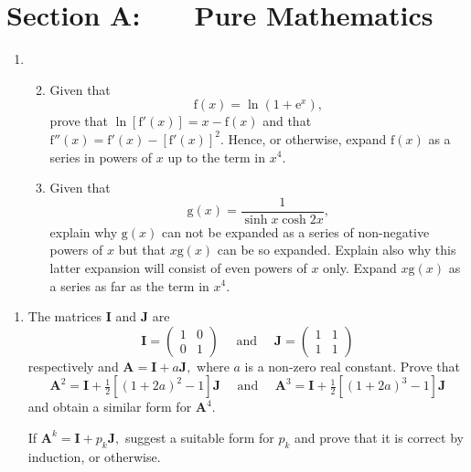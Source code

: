 \documentclass[a4, 11pt]{report}
\newlength{\qspace}
\newcounter{qnumber}
\newenvironment{question}%
 {\vspace{\qspace}
  \begin{enumerate}[\bfseries 1\quad][10]%
    \setcounter{enumi}{\value{qnumber}}%
    \item%
 }
{
  \end{enumerate}
  \filbreak
  \stepcounter{qnumber}
 }
\newenvironment{questionparts}[1][1]%
 {
  \begin{enumerate}[\bfseries (i)]%
    \setcounter{enumii}{#1}
    \addtocounter{enumii}{-1}
    \setlength{\itemsep}{5mm}
    \setlength{\parskip}{8pt}
 }
 {
  \end{enumerate}
 }
\begin{document}
\setcounter{page}{2}

 
\section*{Section A: \ \ \ Pure Mathematics}

\begin{question}
\begin{questionparts}


\item Given that 
\[
\mathrm{f}(x)=\ln(1+\mathrm{e}^{x}),
\]
prove that $\ln[\mathrm{f}'(x)]=x-\mathrm{f}(x)$ and that $\mathrm{f}''(x)=\mathrm{f}'(x)-[\mathrm{f}'(x)]^{2}.$
Hence, or otherwise, expand $\mathrm{f}(x)$ as a series in powers
of $x$ up to the term in $x^{4}.$ 


\item Given that 
\[
\mathrm{g}(x)=\frac{1}{\sinh x\cosh2x},
\]
explain why $\mathrm{g}(x)$ can not be expanded as a series of non-negative
powers of $x$ but that $x\mathrm{g}(x)$ can be so expanded. Explain
also why this latter expansion will consist of even powers of $x$
only. Expand $x\mathrm{g}(x)$ as a series as far as the term in $x^{4}.$
\end{questionparts}

\end{question}

\begin{question}
The matrices $\mathbf{I}$ and $\mathbf{J}$ are 
\[
\mathbf{I}=\begin{pmatrix}1 & 0\\
0 & 1
\end{pmatrix}\quad\mbox{ and }\quad\mathbf{J}=\begin{pmatrix}1 & 1\\
1 & 1
\end{pmatrix}
\]
respectively and $\mathbf{A}=\mathbf{I}+a\mathbf{J},$ where $a$
is a non-zero real constant. Prove that 
\[
\mathbf{A}^{2}=\mathbf{I}+\tfrac{1}{2}[(1+2a)^{2}-1]\mathbf{J}\quad\mbox{ and }\quad\mathbf{A}^{3}=\mathbf{I}+\tfrac{1}{2}[(1+2a)^{3}-1]\mathbf{J}
\]
and obtain a similar form for $\mathbf{A}^{4}.$


If $\mathbf{A}^{k}=\mathbf{I}+p_{k}\mathbf{J},$ suggest a suitable
form for $p_{k}$ and prove that it is correct by induction, or otherwise. 
\end{question}
\end{document}

